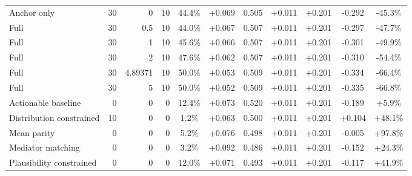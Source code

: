 \begin{table}[htbp]
\begin{tabular}{lrrrccccccc}
Anchor only & 30 & 0 & 10 & 44.4\% & +0.069 & 0.505 & +0.011 & +0.201 & -0.292 & -45.3\% \\
Full & 30 & 0.5 & 10 & 44.0\% & +0.067 & 0.507 & +0.011 & +0.201 & -0.297 & -47.7\% \\
Full & 30 & 1 & 10 & 45.6\% & +0.066 & 0.507 & +0.011 & +0.201 & -0.301 & -49.9\% \\
Full & 30 & 2 & 10 & 47.6\% & +0.062 & 0.507 & +0.011 & +0.201 & -0.310 & -54.4\% \\
Full & 30 & 4.89371 & 10 & 50.0\% & +0.053 & 0.509 & +0.011 & +0.201 & -0.334 & -66.4\% \\
Full & 30 & 5 & 10 & 50.0\% & +0.052 & 0.509 & +0.011 & +0.201 & -0.335 & -66.8\% \\
Actionable baseline & 0 & 0 & 0 & 12.4\% & +0.073 & 0.520 & +0.011 & +0.201 & -0.189 & +5.9\% \\
Distribution constrained & 10 & 0 & 0 & 1.2\% & +0.063 & 0.500 & +0.011 & +0.201 & +0.104 & +48.1\% \\
Mean parity & 0 & 0 & 0 & 5.2\% & +0.076 & 0.498 & +0.011 & +0.201 & -0.005 & +97.8\% \\
Mediator matching & 0 & 0 & 0 & 3.2\% & +0.092 & 0.486 & +0.011 & +0.201 & -0.152 & +24.3\% \\
Plausibility constrained & 0 & 0 & 0 & 12.0\% & +0.071 & 0.493 & +0.011 & +0.201 & -0.117 & +41.9\% \\
\bottomrule
\end{tabular}
\end{table}